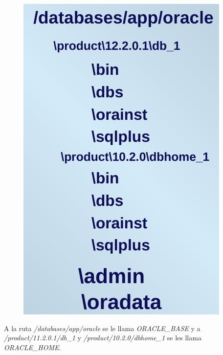 \begin{figure}[H]
  \center
  \includegraphics[scale=0.25]{img/p19.png}
\end{figure}

A la ruta \textit{/databases/app/oracle} se le llama \textit{ORACLE\_BASE} y a \textit{/product/11.2.0.1/db\_1} y \textit{/product/10.2.0/dbhome\_1} se les llama \textit{ORACLE\_HOME}.

